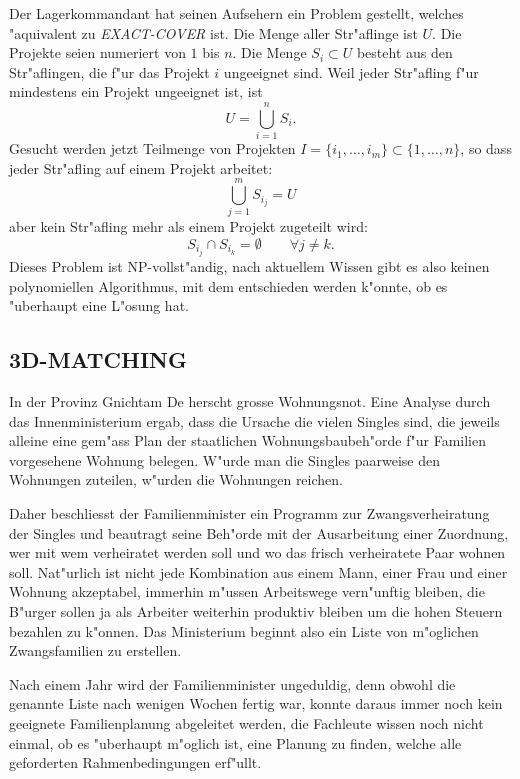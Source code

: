 \medskip

Der Lagerkommandant hat seinen Aufsehern ein Problem gestellt, welches
"aquivalent zu {\it EXACT-COVER} ist.
Die Menge aller Str"aflinge ist $U$.
Die Projekte seien numeriert
von $1$ bis $n$. Die Menge $S_i\subset U$ besteht aus den Str"aflingen, die
f"ur das Projekt $i$ ungeeignet sind. Weil jeder Str"afling f"ur mindestens
ein Projekt ungeeignet ist, ist 
\[
U=\bigcup_{i=1}^n S_i.
\]
Gesucht werden jetzt Teilmenge von Projekten
$I=\{i_1,\dots,i_m\}\subset\{1,\dots,n\}$, so dass 
jeder Str"afling auf einem Projekt arbeitet:
\[
\bigcup_{j=1}^m S_{i_j}=U
\]
aber kein Str"afling mehr als einem Projekt zugeteilt wird:
\[
S_{i_j}\cap S_{i_k}=\emptyset\qquad \forall j\ne k.
\]
Dieses Problem ist NP-vollst"andig, nach aktuellem Wissen gibt es
also keinen polynomiellen Algorithmus, mit dem entschieden werden
k"onnte, ob es "uberhaupt eine L"osung hat.

\subsection{3D-MATCHING}
In der Provinz Gnichtam De herscht grosse Wohnungsnot.
Eine Analyse durch das Innenministerium ergab, dass die Ursache
die vielen Singles sind, die jeweils alleine eine gem"ass
Plan der staatlichen Wohnungsbaubeh"orde f"ur Familien vorgesehene
Wohnung belegen.
W"urde man die Singles paarweise den Wohnungen zuteilen, w"urden die
Wohnungen reichen.

Daher beschliesst der Familienminister ein Programm zur Zwangsverheiratung
der Singles und beautragt seine Beh"orde mit der Ausarbeitung einer Zuordnung,
wer mit wem verheiratet werden soll und wo das frisch verheiratete Paar
wohnen soll.
Nat"urlich ist nicht jede Kombination aus einem Mann,
einer Frau und einer Wohnung akzeptabel, immerhin m"ussen 
Arbeitswege vern"unftig bleiben, die B"urger sollen ja als 
Arbeiter weiterhin produktiv bleiben um die hohen Steuern bezahlen zu k"onnen.
Das Ministerium beginnt also ein Liste von m"oglichen Zwangsfamilien
zu erstellen.

Nach einem Jahr wird der Familienminister ungeduldig, denn obwohl die
genannte Liste nach wenigen Wochen fertig war, konnte daraus immer noch
kein geeignete Familienplanung abgeleitet werden, die Fachleute wissen
noch nicht einmal, ob es "uberhaupt m"oglich ist, eine Planung
zu finden, welche alle geforderten Rahmenbedingungen erf"ullt.

